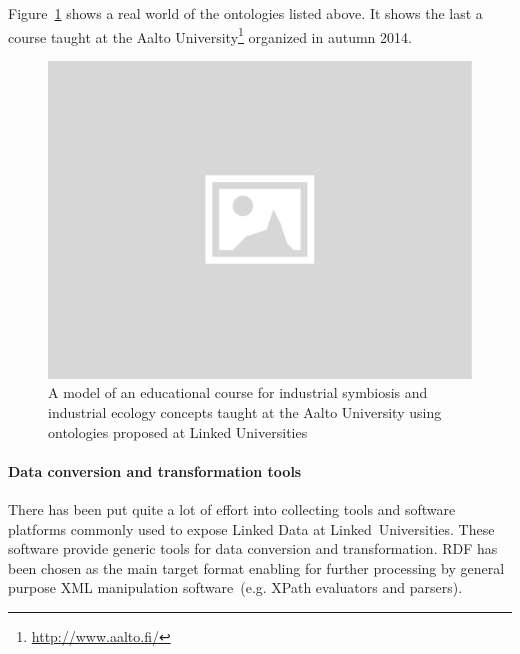 \documentclass{article}
\begin{document}
Figure~\ref{fig:teach_example} shows a real world of the ontologies listed above. 
It shows the last a course taught at the Aalto University\footnote{\url{http://www.aalto.fi/}} organized in autumn 2014. 
\begin{figure}[H]
	\centering \includegraphics*[width=.8\columnwidth]{placeholder.png}
	\caption{A model of an educational course for industrial symbiosis and industrial ecology concepts taught at the Aalto University using ontologies proposed at Linked Universities}
	\label{fig:teach_example}
\end{figure}

\paragraph{Data conversion and transformation tools}
There has been put quite a lot of effort into collecting tools and software platforms commonly used to expose Linked Data at Linked~Universities. 
These software provide generic tools for data conversion and transformation. RDF has been chosen as the main target format enabling for further processing by general purpose XML manipulation software~(e.g. XPath evaluators and parsers).
\end{document}
